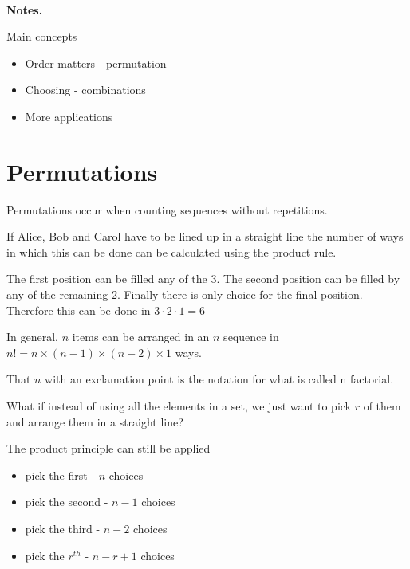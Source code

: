 \documentclass[12pt]{article}
\begin{document}
\begin{center}
\\
\vspace{1cm}
\end{center}


\medskip\noindent

{\bf Notes.}

Main concepts

\begin{itemize}
\item Order matters - permutation
\item Choosing - combinations
\item More applications
\end{itemize}
\vspace{0.5cm}\noindent

\section*{Permutations}
Permutations occur when counting sequences without repetitions. 

If Alice, Bob and Carol have to be lined up in a straight line the number of ways in which this can be done can be calculated using the product rule. 

The first position can be filled any of the 3. The second position can be filled by any of the remaining 2. Finally there is only choice for the final position. Therefore this can be done in $3 \cdot 2 \cdot 1 = 6$

In general, $n$ items can be arranged in an $n$ sequence in $n! = n \times (n-1) \times (n-2) \times 1$ ways.

That $n$ with an exclamation point is the notation for what is called n factorial.

What if instead of using all the elements in a set, we just want to pick $r$ of them and arrange them in a straight line?

The product principle can still be applied

\begin{itemize}
\item pick the first - $n$ choices
\item pick the second - $n-1$ choices
\item pick the third - $n-2$ choices
\item pick the $r^{th}$ - $n-r+1$ choices
\end{itemize}
\end{document}
